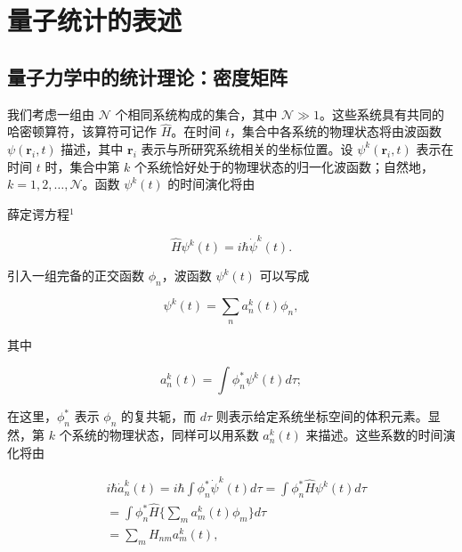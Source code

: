 ﻿\chapter{量子统计的表述}

\section{量子力学中的统计理论：密度矩阵}\label{ux91cfux5b50ux529bux5b66ux4e2dux7684ux7edfux8ba1ux7406ux8bbaux5bc6ux5ea6ux77e9ux9635}

我们考虑一组由 \(\mathcal{N}\) 个相同系统构成的集合，其中 \(\mathcal{N} \gg 1\)。这些系统具有共同的哈密顿算符，该算符可记作 \(\hat{H}\)。在时间 \(t\)，集合中各系统的物理状态将由波函数 \(\psi(\boldsymbol{r}_i,t)\) 描述，其中 \(\boldsymbol{r}_i\) 表示与所研究系统相关的坐标位置。设 \(\psi^k(\boldsymbol{r}_i,t)\) 表示在时间 \(t\) 时，集合中第 \(k\) 个系统恰好处于的物理状态的归一化波函数；自然地，\(k=1,2,\ldots,\mathcal{N}\)。函数 \(\psi^k(t)\) 的时间演化将由

薛定谔方程\(^{1}\)

\begin{equation}\tag{5.1.1}\label{eq:5.1.1}
\hat { H } \psi ^{k} ( t ) = i \hbar \dot { \psi } ^{k} ( t ) .
\end{equation}

引入一组完备的正交函数 \(\phi_{n}\)，波函数 \(\psi^{k}(t)\) 可以写成

\begin{equation}\tag{5.1.2}\label{eq:5.1.2}
\psi ^{k} ( t ) = \sum _ { n } a _ { n } ^{k} ( t ) \phi _ { n } ,
\end{equation}

其中

\begin{equation}\tag{5.1.3}\label{eq:5.1.3}
a _ { n } ^{k} ( t ) = \int \phi _ { n } ^{*} \psi ^{k} ( t ) d \tau ;
\end{equation}

在这里，\(\phi_{n}^{*}\) 表示 \(\phi_{n}\) 的复共轭，而 \(d\tau\) 则表示给定系统坐标空间的体积元素。显然，第 \(k\) 个系统的物理状态，同样可以用系数 \(a_{n}^{k}(t)\) 来描述。这些系数的时间演化将由

\begin{equation}\tag{5.1.4}\label{eq:5.1.4}
\begin{array}{rl} & { i \hbar \dot { a } _ { n } ^{k} ( t ) = i \hbar \int \phi _ { n } ^{*} \dot { \psi } ^{k} ( t ) d \tau = \int \phi _ { n } ^{*} \hat { H } \psi ^{k} ( t ) d \tau } \\& {  = \int \phi _ { n } ^{*} \hat { H } \Big \{ \sum _ { m } a _ { m } ^{k} ( t ) \phi _ { m } \Big \} d \tau } \\& {  = \sum _ { m } H _ { n m } a _ { m } ^{k} ( t ) , } \end{array}
\end{equation}

